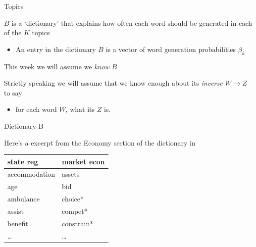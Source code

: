 \documentclass{hertieteaching}
\begin{document}
\begin{frame}{Topics}

\begin{center}
\end{center}


$B$ is a `dictionary' that explains how often each word should be generated in each of the $K$ topics
\begin{itemize}
  \item An entry in the dictionary $B$ is a vector of word generation probabilities $\beta_k$ 
\end{itemize}
This week we will assume we \textit{know} $B$

\pause
Strictly speaking we will assume that we know enough about its \textit{inverse} $W \longrightarrow Z$ to say
\begin{itemize}
  \item for each word $W$, what its $Z$ is.
\end{itemize}

\end{frame}

\begin{frame}{Dictionary B}

Here's a excerpt from the Economy section of the dictionary in \textcite{Laver.Garry2000}

\medskip
\begin{center}
\begin{tabular}{ll} \toprule
  \textbf{state reg}     & \textbf{market econ} \\ \midrule
          accommodation  & assets\\
          age            & bid\\
          ambulance      & choice*\\
          assist         & compet*\\
          benefit        & constrain*\\
          \ldots         & \ldots 
\end{tabular}
\end{center}

\end{frame}
\end{document}
